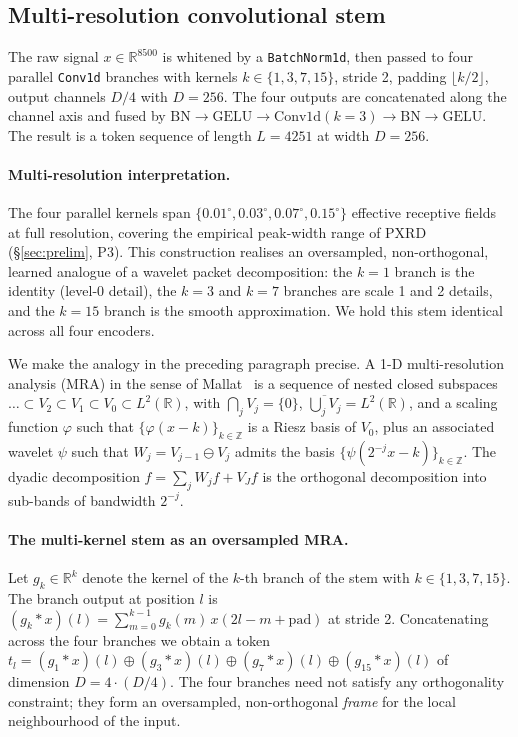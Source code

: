 \documentclass[final]{ws-ijwmip}
\begin{document}
\subsection{Multi-resolution convolutional stem}

The raw signal $x\in\mathbb{R}^{8500}$ is whitened by a
\texttt{BatchNorm1d}, then passed to four parallel
\texttt{Conv1d} branches with kernels
$k\in\{1,3,7,15\}$, stride 2, padding $\lfloor k/2\rfloor$, output
channels $D/4$ with $D=256$. The four outputs are concatenated along the
channel axis and fused by
$\mathrm{BN}\!\to\!\mathrm{GELU}\!\to\!\mathrm{Conv1d}(k=3)\!\to\!
 \mathrm{BN}\!\to\!\mathrm{GELU}$. The result is a token sequence
of length $L=4251$ at width $D=256$.

\paragraph{Multi-resolution interpretation.}
The four parallel kernels span $\{0.01^\circ, 0.03^\circ, 0.07^\circ,
0.15^\circ\}$ effective receptive fields at full resolution, covering
the empirical peak-width range of PXRD (\S\ref{sec:prelim}, P3). This
construction realises an oversampled, non-orthogonal, learned analogue
of a wavelet packet decomposition: the $k=1$ branch is the identity
(level-0 detail), the $k=3$ and $k=7$ branches are scale 1 and 2 details,
and the $k=15$ branch is the smooth approximation. We hold this stem
identical across all four encoders.

\label{sub:mra}

We make the analogy in the preceding paragraph precise. A 1-D
multi-resolution analysis (MRA) in the sense of Mallat~\cite{mallat1999}
is a sequence of nested closed subspaces
$\dots\subset V_2\subset V_1\subset V_0\subset L^2(\mathbb{R})$, with
$\bigcap_j V_j = \{0\}$, $\overline{\bigcup_j V_j}=L^2(\mathbb{R})$, and
a scaling function $\varphi$ such that
$\{\varphi(x-k)\}_{k\in\mathbb{Z}}$ is a Riesz basis of $V_0$, plus an
associated wavelet $\psi$ such that
$W_j = V_{j-1}\ominus V_j$ admits the basis
$\{\psi(2^{-j}x-k)\}_{k\in\mathbb{Z}}$. The dyadic decomposition
$f = \sum_j W_j f + V_J f$ is the orthogonal decomposition into
sub-bands of bandwidth $2^{-j}$.

\paragraph{The multi-kernel stem as an oversampled MRA.}
Let $g_k\in\mathbb{R}^{k}$ denote the kernel of the $k$-th branch of
the stem with $k\in\{1,3,7,15\}$. The branch output at position $l$ is
$(g_k * x)(l) = \sum_{m=0}^{k-1} g_k(m)\, x(2l - m + \mathrm{pad})$ at
stride 2. Concatenating across the four branches we obtain a token
$t_l = (g_1 * x)(l)\oplus (g_3 * x)(l)\oplus (g_7 * x)(l)\oplus (g_{15} * x)(l)$
of dimension $D = 4\cdot(D/4)$. The four branches need not satisfy any
orthogonality constraint; they form an oversampled, non-orthogonal
\emph{frame} for the local neighbourhood of the input.
\end{document}
